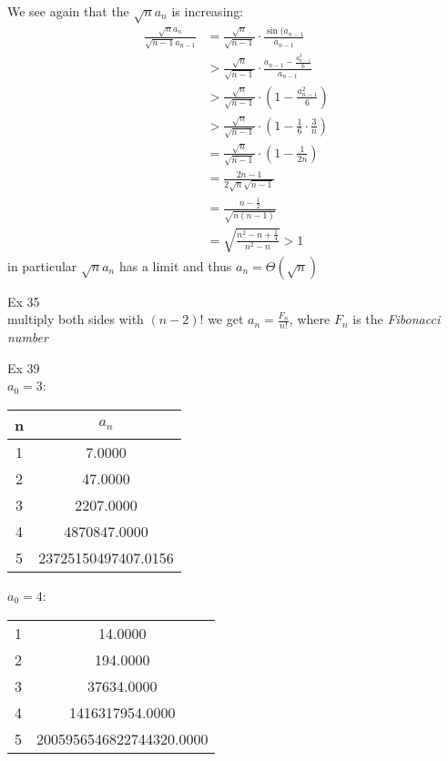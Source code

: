 \documentclass{article}
\begin{document}
We see again that the $\sqrt{n}a_n$ is increasing:
\begin{align*}
	\frac{\sqrt{n}a_n}{\sqrt{n-1}a_{n-1}} &= \frac{\sqrt{n}}{\sqrt{n-1}} \cdot \frac{\sin(a_{n-1}}{a_{n-1}} \\
	&> \frac{\sqrt{n}}{\sqrt{n-1}} \cdot \frac{a_{n-1} - \frac{a_{n-1}^3}{6}}{a_{n-1}}\\
	&> \frac{\sqrt{n}}{\sqrt{n-1}} \cdot (1 - \frac{a_{n-1}^2}{6}) \\
	&> \frac{\sqrt{n}}{\sqrt{n-1}} \cdot (1 - \frac{1}{6}\cdot\frac{3}{n})\\
	&= \frac{\sqrt{n}}{\sqrt{n-1}} \cdot (1 - \frac{1}{2n})\\
	&= \frac{2n-1}{2\sqrt{n}\sqrt{n-1}}\\
	&= \frac{n-\frac{1}{2}}{\sqrt{n(n-1)}}\\
	&= \sqrt{\frac{n^2 - n + \frac{1}{4}}{n^2-n}} > 1
\end{align*}
in particular $\sqrt{n}a_n$ has a limit and thus $a_n = \Theta(\sqrt{n})$

Ex 35\\
multiply both sides with $(n-2)!$
we get $a_n = \frac{F_n}{n!}$, where $F_n$ is the \emph{Fibonacci number}

Ex 39\\
$a_0 = 3$:
\begin{center}
	\begin{tabular}{||c c||}
	\hline
	n & $a_n$ \\ [0.8ex]
	\hline \hline
	  1 & 7.0000\\
  2 & 47.0000\\
  3 & 2207.0000\\
  4 & 4870847.0000\\
  5 & 23725150497407.0156\\[1ex]
  \hline
	\end{tabular}
\end{center}

$a_0 = 4$:
\begin{center}
	\begin{tabular}{||c c||}
	\hline
	  1 & 14.0000\\
  2 & 194.0000\\
  3 & 37634.0000\\
  4 & 1416317954.0000\\
  5 & 2005956546822744320.0000\\[1ex]
  \hline
	\end{tabular}
\end{center}
\end{document}
